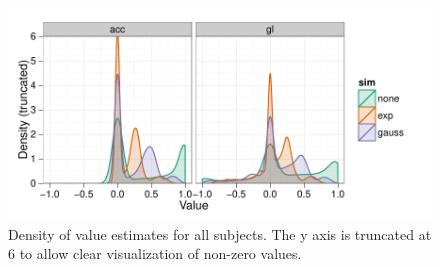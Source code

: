 \documentclass[doc,12pt]{apa}        %
\begin{document}
\begin{figure}[tp]
	\includegraphics{f_density_value}
    \centering
    \caption{Density of value estimates for all subjects.  The y axis is truncated at 6 to allow clear visualization of non-zero values.}
	\label{fig:denvalue}
\end{figure}

\newpage

\end{document}

